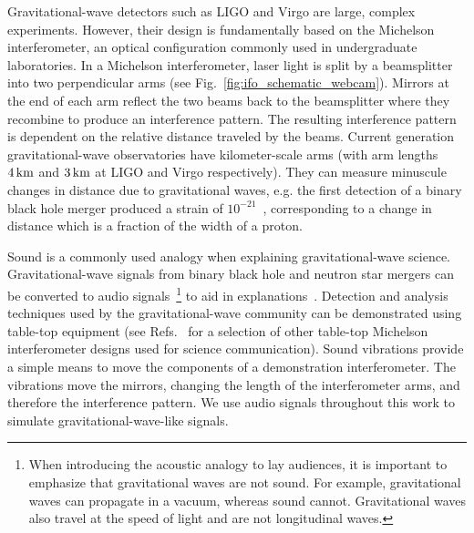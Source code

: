 \documentclass[paper-main.tex]{subfiles}
\begin{document}
Gravitational-wave detectors such as LIGO and Virgo are large, complex experiments. 
However, their design is fundamentally based on the Michelson interferometer, an optical configuration commonly used in undergraduate laboratories. 
In a Michelson interferometer, laser light is split by a beamsplitter into two perpendicular arms (see Fig.~\ref{fig:ifo_schematic_webcam}). 
Mirrors at the end of each arm reflect the two beams back to the beamsplitter where they recombine to produce an interference pattern.
The resulting interference pattern is dependent on the relative distance traveled by the beams. 
Current generation gravitational-wave observatories have kilometer-scale arms (with arm lengths $4\,{\rm km}$ and $3\,{\rm km}$ at LIGO and Virgo respectively). 
They can measure minuscule changes in distance due to gravitational waves, e.g. the first detection of a binary black hole merger produced a strain of $10^{-21}$~\cite{GW150914}, corresponding to a change in distance which is a fraction of the width of a proton. 



Sound is a commonly used analogy when explaining gravitational-wave science. 
Gravitational-wave signals from binary black hole and neutron star mergers can be converted to audio signals~\footnote{When introducing the acoustic analogy to lay audiences, it is important to emphasize that gravitational waves are not sound. For example, gravitational waves can propagate in a vacuum, whereas sound cannot. Gravitational waves also travel at the speed of light and are not longitudinal waves.} to aid in explanations~\cite{SoundsOfSpaceTime:online,BlackHoleHunter:online}.
Detection and analysis techniques used by the gravitational-wave community can be demonstrated using table-top equipment (see Refs.~\cite{TTExhibit:2020,TTExhibit:online,AMIGO:online,ThorLabsIFO,LIGOIFOGlue,LIGOIFOMagnets,FoxEtAl:1999} for a selection of other table-top Michelson interferometer designs used for science communication).
Sound vibrations provide a simple means to move the components of a demonstration interferometer. 
The vibrations move the mirrors, changing the length of the interferometer arms, and therefore the interference pattern.
We use audio signals throughout this work to simulate gravitational-wave-like signals.
\end{document}
